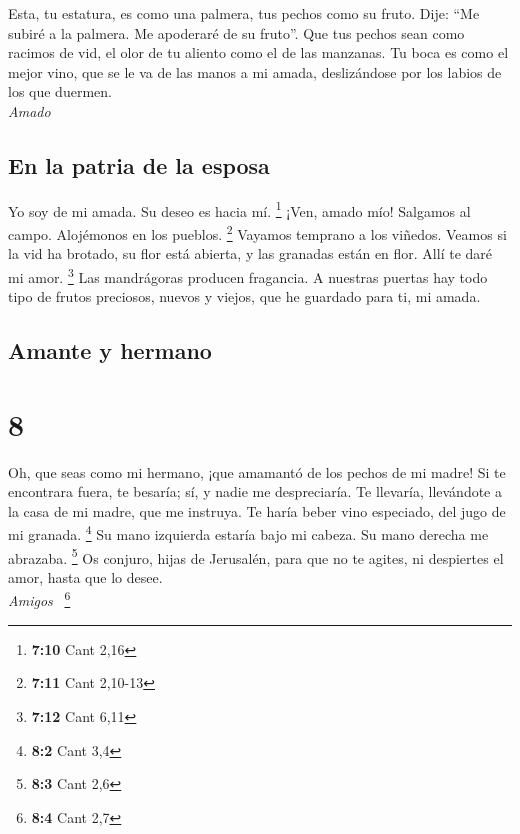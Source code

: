 Esta, tu estatura, es como una palmera, tus pechos como
su fruto.  Dije: ``Me subiré a la palmera. Me apoderaré de
su fruto''. Que tus pechos sean como racimos de vid, el olor de tu
aliento como el de las manzanas.  Tu boca es como el mejor
vino, que se le va de las manos a mi amada, deslizándose por los labios
de los que duermen.\\
\emph{Amado}\\

\hypertarget{en-la-patria-de-la-esposa}{%
\subsection{En la patria de la esposa}\label{en-la-patria-de-la-esposa}}

 Yo soy de mi amada. Su deseo es hacia mí. \footnote{\textbf{7:10}
  Cant 2,16}  ¡Ven, amado mío! Salgamos al campo.
Alojémonos en los pueblos. \footnote{\textbf{7:11} Cant 2,10-13}
 Vayamos temprano a los viñedos. Veamos si la vid ha
brotado, su flor está abierta, y las granadas están en flor. Allí te
daré mi amor. \footnote{\textbf{7:12} Cant 6,11}  Las
mandrágoras producen fragancia. A nuestras puertas hay todo tipo de
frutos preciosos, nuevos y viejos, que he guardado para ti, mi amada.

\hypertarget{amante-y-hermano}{%
\subsection{Amante y hermano}\label{amante-y-hermano}}

\hypertarget{section-7}{%
\section{8}\label{section-7}}

 Oh, que seas como mi hermano, ¡que amamantó de los pechos
de mi madre! Si te encontrara fuera, te besaría; sí, y nadie me
despreciaría.  Te llevaría, llevándote a la casa de mi
madre, que me instruya. Te haría beber vino especiado, del jugo de mi
granada. \footnote{\textbf{8:2} Cant 3,4}  Su mano
izquierda estaría bajo mi cabeza. Su mano derecha me abrazaba.
\footnote{\textbf{8:3} Cant 2,6}  Os conjuro, hijas de
Jerusalén, para que no te agites, ni despiertes el amor, hasta que lo
desee.\\
\emph{Amigos} ~\footnote{\textbf{8:4} Cant 2,7}

